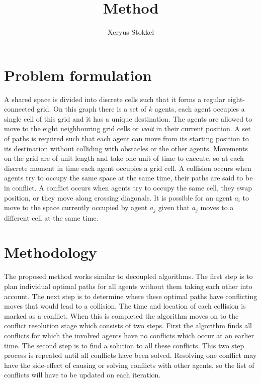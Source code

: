 \documentclass[a4paper]{article}
\title{Method}
\author{Xeryus Stokkel}
\date{}
\begin{document}
\maketitle


\section{Problem formulation}
A shared space is divided into discrete cells such that it forms a regular eight-connected grid. On this graph there is a set of $k$ agents, each agent occupies a single cell of this grid and it has a unique destination. The agents are allowed to move to the eight neighbouring grid cells or \emph{wait} in their current position. A set of paths is required such that each agent can move from its starting position to its destination without colliding with obstacles or the other agents. Movements on the grid are of unit length and take one unit of time to execute, so at each discrete moment in time each agent occupies a grid cell. A collision occurs when agents try to occupy the same space at the same time, their paths are said to be in conflict. A conflict occurs when agents try to occupy the same cell, they swap position, or they move along crossing diagonals. It is possible for an agent $a_i$ to move to the space currently occupied by agent $a_j$ given that $a_j$ moves to a different cell at the same time.

\section{Methodology}
The proposed method works similar to decoupled algorithms. The first step is to 
plan individual optimal paths for all agents without them taking each other 
into account. The next step is to determine where these optimal paths have 
conflicting moves that would lead to a collision. The time and location of each 
collision is marked as a conflict. When this is completed the algorithm moves 
on to the conflict resolution stage which consists of two steps. First the 
algorithm finds all conflicts for which the involved agents have no conflicts 
which occur at an earlier time. The second step is to find a solution to all 
these conflicts. This two step process is repeated until all conflicts have 
been solved. Resolving one conflict may have the side-effect of causing or solving conflicts with other agents, so the list of conflicts will have to be updated on each iteration.
\end{document}
